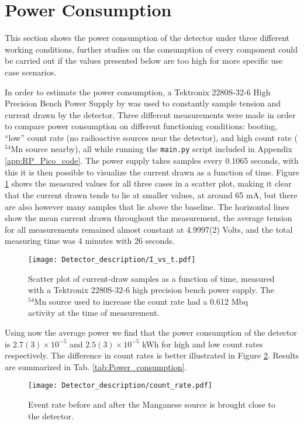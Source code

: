 \section{Power Consumption}

This section shows the power consumption of the detector under three different working conditions, further studies on the consumption of every component could be carried out if the values presented below are too high for more specific use case scenarios.

In order to estimate the power consumption, a Tektronix 2280S-32-6 High Precision Bench Power Supply by was used to constantly sample tension and current drawn by the detector. Three different measurements were made in order to compare power consumption on different functioning conditions: booting, ``low'' count rate (no radioactive sources near the detector), and high count rate ($^{54}$Mn source nearby), all while running the \texttt{main.py} script included in Appendix \ref{app:RP_Pico_code}. The power supply takes samples every 0.1065 seconds, with this it is then possible to visualize the current drawn as a function of time. Figure \ref{fig:I_vs_t} shows the measured values for all three cases in a scatter plot, making it clear that the current drawn tends to lie at smaller values, at around 65 mA, but there are also however many samples that lie above the baseline. The horizontal lines show the mean current drawn throughout the measurement, the average tension for all measurements remained almost constant at 4.9997(2) Volts, and the total measuring time was 4 minutes with 26 seconds.

\begin{figure}[H]
  \centering
  \texttt{[image: Detector\_description/I\_vs\_t.pdf]}
  \caption{Scatter plot of current-draw samples as a function of time, measured with a Tektronix 2280S-32-6 high precision bench power supply. The $^{54}$Mn source used to increase the count rate had a 0.612 Mbq activity at the time of measurement.}
  \label{fig:I_vs_t}
\end{figure}

 Using now the average power we find that the power consumption of the detector is $2.7(3)\times10^{-5}$ and $2.5(3)\times10^{-5}$ kWh for high and low count rates respectively. The difference in count rates is better illustrated in Figure \ref{fig:count_rate_for_power}. Results are summarized in Tab. \ref{tab:Power_consumption}.

\begin{figure}[H]
  \centering
  \texttt{[image: Detector\_description/count\_rate.pdf]}
  \caption{Event rate before and after the Manganese source is brought close to the detector.}
  \label{fig:count_rate_for_power}
\end{figure}

